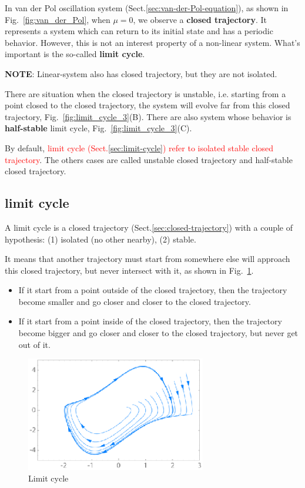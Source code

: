 In van der Pol oscillation system (Sect.\ref{sec:van-der-Pol-equation}), as
shown in Fig.~\ref{fig:van_der_Pol}, when $\mu=0$, we observe a {\bf closed
trajectory}. It represents a system which can return to its initial state and
has a periodic behavior. However, this is not an interest property of a
non-linear system. What's important is the so-called {\bf limit cycle}.

{\bf NOTE}: Linear-system also has closed trajectory, but they are not
isolated. 

There are situation when the closed trajectory is unstable,
i.e. starting from a point closed to the closed trajectory, the system
will evolve far from this closed trajectory,
Fig.~\ref{fig:limit_cycle_3}(B). There are also system whose behavior
is {\bf half-stable} limit cycle,
Fig.~\ref{fig:limit_cycle_3}(C). 

By default,
\textcolor{red}{limit cycle (Sect.\ref{sec:limit-cycle}) refer to isolated
stable closed trajectory}. The others cases are called unstable closed trajectory
and half-stable closed trajectory.

\subsection{limit cycle}

A limit cycle is a closed trajectory (Sect.\ref{sec:closed-trajectory}) with a
couple of hypothesis: (1) isolated (no other nearby), (2) stable. 

It means that another trajectory must start from somewhere else will approach
this closed trajectory, but never intersect with it, as shown in
Fig.~\ref{fig:limit_cycle}.

\begin{itemize}
\item If it start from a point outside of the closed trajectory, then
  the trajectory become smaller and go closer and closer to the closed
  trajectory.

\item If it start from a point inside of the closed trajectory, then
  the trajectory become bigger and go closer and closer to the closed
  trajectory, but never get out of it.
\end{itemize}


\begin{figure}[hbt]
  \centerline{\includegraphics[height=5cm,
    angle=0]{./images/limit_cycle.eps}}
  \caption{Limit cycle}
  \label{fig:limit_cycle}
\end{figure}


